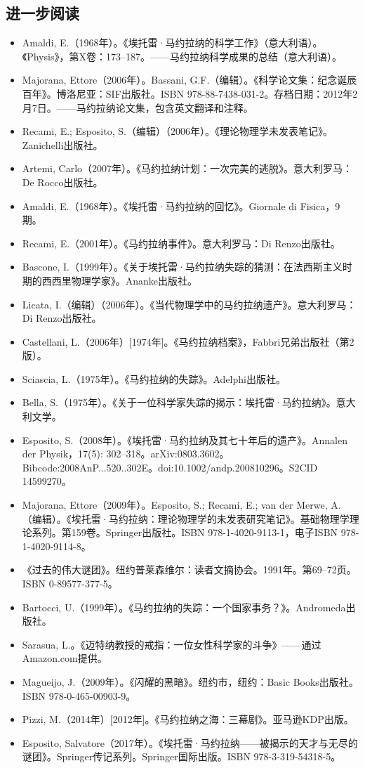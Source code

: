 \subsection{进一步阅读}
\begin{itemize}
\item Amaldi, E.（1968年）。《埃托雷·马约拉纳的科学工作》（意大利语）。《Physis》，第X卷：173–187。——马约拉纳科学成果的总结（意大利语）。
\item Majorana, Ettore（2006年）。Bassani, G.F.（编辑）。《科学论文集：纪念诞辰百年》。博洛尼亚：SIF出版社。ISBN 978-88-7438-031-2。存档日期：2012年2月7日。——马约拉纳论文集，包含英文翻译和注释。
\item Recami, E.; Esposito, S.（编辑）（2006年）。《理论物理学未发表笔记》。Zanichelli出版社。
\item Artemi, Carlo（2007年）。《马约拉纳计划：一次完美的逃脱》。意大利罗马：De Rocco出版社。
\item Amaldi, E.（1968年）。《埃托雷·马约拉纳的回忆》。Giornale di Fisica，9期。
\item Recami, E.（2001年）。《马约拉纳事件》。意大利罗马：Di Renzo出版社。
\item Bascone, I.（1999年）。《关于埃托雷·马约拉纳失踪的猜测：在法西斯主义时期的西西里物理学家》。Ananke出版社。
\item Licata, I.（编辑）（2006年）。《当代物理学中的马约拉纳遗产》。意大利罗马：Di Renzo出版社。
\item Castellani, L.（2006年）[1974年]。《马约拉纳档案》，Fabbri兄弟出版社（第2版）。
\item Sciascia, L.（1975年）。《马约拉纳的失踪》。Adelphi出版社。
\item Bella, S.（1975年）。《关于一位科学家失踪的揭示：埃托雷·马约拉纳》。意大利文学。
\item Esposito, S.（2008年）。《埃托雷·马约拉纳及其七十年后的遗产》。Annalen der Physik，17(5): 302–318。arXiv:0803.3602。Bibcode:2008AnP...520..302E。doi:10.1002/andp.200810296。S2CID 14599270。
\item Majorana, Ettore（2009年）。Esposito, S.; Recami, E.; van der Merwe, A.（编辑）。《埃托雷·马约拉纳：理论物理学的未发表研究笔记》。基础物理学理论系列。第159卷。Springer出版社。ISBN 978-1-4020-9113-1，电子ISBN 978-1-4020-9114-8。
\item 《过去的伟大谜团》。纽约普莱森维尔：读者文摘协会。1991年。第69–72页。ISBN 0-89577-377-5。
\item Bartocci, U.（1999年）。《马约拉纳的失踪：一个国家事务？》。Andromeda出版社。
\item Sarasua, L.。《迈特纳教授的戒指：一位女性科学家的斗争》——通过Amazon.com提供。
\item Magueijo, J.（2009年）。《闪耀的黑暗》。纽约市，纽约：Basic Books出版社。ISBN 978-0-465-00903-9。
\item Pizzi, M.（2014年）[2012年]。《马约拉纳之海：三幕剧》。亚马逊KDP出版。
\item Esposito, Salvatore（2017年）。《埃托雷·马约拉纳——被揭示的天才与无尽的谜团》。Springer传记系列。Springer国际出版。ISBN 978-3-319-54318-5。
\end{itemize}
